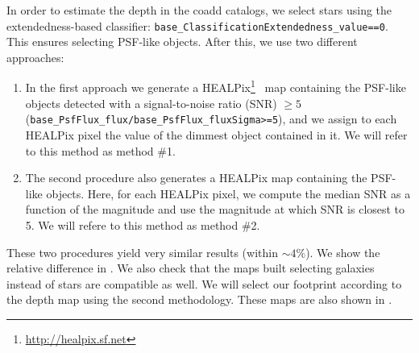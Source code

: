 \documentclass[twocolumn]{aastex62}
\begin{document}
In order to estimate the depth in the coadd catalogs, we select stars using the extendedness-based classifier: \texttt{base\_ClassificationExtendedness\_value==0}. This ensures selecting
PSF-like objects. After this, we use two different approaches:

\begin{enumerate}
\item In the first approach we generate a HEALPix\footnote{\url{http://healpix.sf.net}}~\citep{2005ApJ...622..759G} map containing the PSF-like objects detected with a signal-to-noise ratio (SNR) $\geq 5$ (\texttt{base\_PsfFlux\_flux/base\_PsfFlux\_fluxSigma>=5}), and we assign to each HEALPix pixel the value of the
dimmest object contained in it. We will refer to this method as method \#1.
\item The second procedure also generates a HEALPix map containing the PSF-like objects. Here, for each HEALPix pixel, we compute the median SNR as a function of the magnitude and use the magnitude at which SNR is closest to 5. We will refere to this method as method \#2.
\end{enumerate}

These two procedures yield very similar results (within $\sim 4\%$). We show the relative difference in . We also check that the maps built selecting galaxies instead of stars are compatible as well. We will select our footprint according to the depth map using the second methodology. These maps are also shown in .
\end{document}
